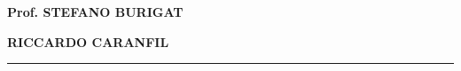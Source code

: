 \begin{titlepage}
\begin{minipage}[t]{0.47\textwidth}
    \large\bf{Prof. STEFANO BURIGAT}
\end{minipage}
\hfill
\begin{minipage}[t]{0.47\textwidth}\raggedleft
    \large\bf{RICCARDO CARANFIL}
\end{minipage}

\vspace{18mm}
\begin{center}
    {\rule[0.2cm]{5cm}{0.3mm}\\
    \large{}}
\end{center}
\end{titlepage}
\restoregeometry
